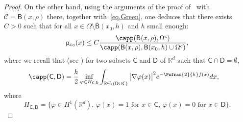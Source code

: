 \begin{proof}
On the other hand, using the arguments of the proof of~\cite[Prop.\,7.9]{landim2017dirichlet} with $\mathcal C= \mathsf B(x,\rho)$ there, together with~\eqref{eq.Green}, one deduces that there exists $C>0$ such that for all $x\in \Omega\setminus \overline{\mathsf B}(x_0,h)$ and $h$ small enough:
\begin{equation}\label{eq.capa-ineq}
\mathsf p_{x_0}(x)\le C \frac{\capp(\mathsf B(x,\rho), \Omega^c) }{\capp(\mathsf B(x,\rho), \mathsf B(x_0,h) \cup \Omega^c)},
\end{equation}
where we recall that (see \cite[\S2]{BEGK}) for two subsets $\mathsf C$ and $\mathsf D$ of $ \mathbb R^d$ such that $ \overline{\mathsf C}\cap\overline{ \mathsf D}=\emptyset$,
\begin{align}
\label{eq.mini}
\capp({\mathsf C},\mathsf D)&=\frac h2\inf_{\varphi\in H_{\mathsf C, \mathsf D}} \int_{\mathbb R^d\setminus (\mathsf D\cup \mathsf C)}\big \vert \nabla \varphi (x)\bigr\vert^2e^{-\Psfrac{2}{h}f(x)}dx,
\end{align}
where
\[
H_{\mathsf C, \mathsf D}=\big \{ \varphi \in H^1(\mathbb R^d),\, \varphi (x)=1 \text{ for } x\in \mathsf C, \, \varphi (x)=0 \text{ for } x\in\mathsf D\}.
\]



\end{proof}
